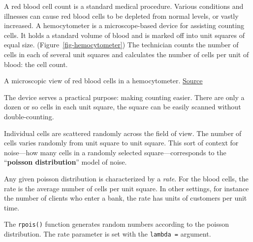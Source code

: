\documentclass[
  letterpaper,
  DIV=11,
  numbers=noendperiod,
  oneside]{scrartcl}
\begin{document}
A red blood cell count is a standard medical procedure. Various
conditions and illnesses can cause red blood cells to be depleted from
normal levels, or vastly increased. A hemocytometer is a
microscope-based device for assisting counting cells. It holds a
standard volume of blood and is marked off into unit squares of equal
size. (Figure~\ref{fig-hemocytometer}) The technician counts the number
of cells in each of several unit squares and calculates the number of
cells per unit of blood: the cell count.

\begin{marginfigure}


\caption{\label{fig-hemocytometer}A microscopic view of red blood cells
in a hemocytometer.
\href{https://www.semanticscholar.org/paper/Red-Blood-Cell-Count\%3A-Brief-History-and-New-Method-Math-Kattimani/970664e045f1047535ccb2e09a41bf251d1a8b27}{Source}}

\end{marginfigure}%

The device serves a practical purpose: making counting easier. There are
only a dozen or so cells in each unit square, the square can be easily
scanned without double-counting.

Individual cells are scattered randomly across the field of view. The
number of cells varies randomly from unit square to unit square. This
sort of context for noise---how many cells in a randomly selected
square---corresponds to the ``\textbf{poisson distribution}'' model of
noise.

Any given poisson distribution is characterized by a \emph{rate}. For
the blood cells, the rate is the average number of cells per unit
square. In other settings, for instance the number of clients who enter
a bank, the rate has units of customers per unit time.

The \texttt{rpois()} function generates random numbers according to the
poisson distribution. The rate parameter is set with the
\texttt{lambda\ =} argument.
\end{document}
